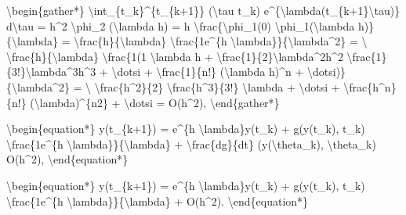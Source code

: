 \documentclass[letterpaper,10pt,english]{jupyterBook}
\begin{document}
\sphinxAtStartPar
\textbackslash{}begin\{gather*\}
\textbackslash{}int\_\{t\_k\}\textasciicircum{}\{t\_\{k+1\}\} (\textbackslash{}tau \sphinxhyphen{} t\_k) e\textasciicircum{}\{\sphinxhyphen{}\textbackslash{}lambda(t\_\{k+1\}\sphinxhyphen{}\textbackslash{}tau)\} d\textbackslash{}tau =
h\textasciicircum{}2 \textbackslash{}phi\_2 (\sphinxhyphen{}\textbackslash{}lambda h) =
h \textbackslash{}frac\{\textbackslash{}phi\_1(0) \sphinxhyphen{} \textbackslash{}phi\_1(\sphinxhyphen{}\textbackslash{}lambda h)\}\{\textbackslash{}lambda\} =
\textbackslash{}frac\{h\}\{\textbackslash{}lambda\} \sphinxhyphen{} \textbackslash{}frac\{1\sphinxhyphen{}e\textasciicircum{}\{\sphinxhyphen{}h \textbackslash{}lambda\}\}\{\textbackslash{}lambda\textasciicircum{}2\} = \textbackslash{}
\textbackslash{}frac\{h\}\{\textbackslash{}lambda\} \sphinxhyphen{} \textbackslash{}frac\{1\sphinxhyphen{}(1 \sphinxhyphen{} \textbackslash{}lambda h + \textbackslash{}frac\{1\}\{2\}\textbackslash{}lambda\textasciicircum{}2h\textasciicircum{}2 \sphinxhyphen{} \textbackslash{}frac\{1\}\{3!\}\textbackslash{}lambda\textasciicircum{}3h\textasciicircum{}3 + \textbackslash{}dotsi + \textbackslash{}frac\{1\}\{n!\} (\sphinxhyphen{}\textbackslash{}lambda h)\textasciicircum{}n + \textbackslash{}dotsi)\}\{\textbackslash{}lambda\textasciicircum{}2\} = \textbackslash{}
\textbackslash{}frac\{h\textasciicircum{}2\}\{2\} \sphinxhyphen{} \textbackslash{}frac\{h\textasciicircum{}3\}\{3!\} \textbackslash{}lambda + \textbackslash{}dotsi + \textbackslash{}frac\{h\textasciicircum{}n\}\{n!\} (\sphinxhyphen{}\textbackslash{}lambda)\textasciicircum{}\{n\sphinxhyphen{}2\} + \textbackslash{}dotsi  =  O(h\textasciicircum{}2),
\textbackslash{}end\{gather*\}

\sphinxAtStartPar
\textbackslash{}begin\{equation*\}
y(t\_\{k+1\}) = e\textasciicircum{}\{\sphinxhyphen{}h \textbackslash{}lambda\}y(t\_k) + g(y(t\_k), t\_k) \textbackslash{}frac\{1\sphinxhyphen{}e\textasciicircum{}\{\sphinxhyphen{}h \textbackslash{}lambda\}\}\{\textbackslash{}lambda\} + \textbackslash{}frac\{dg\}\{dt\} (y(\textbackslash{}theta\_k), \textbackslash{}theta\_k) O(h\textasciicircum{}2),
\textbackslash{}end\{equation*\}

\sphinxAtStartPar
\textbackslash{}begin\{equation*\}
y(t\_\{k+1\}) = e\textasciicircum{}\{\sphinxhyphen{}h \textbackslash{}lambda\}y(t\_k) + g(y(t\_k), t\_k) \textbackslash{}frac\{1\sphinxhyphen{}e\textasciicircum{}\{\sphinxhyphen{}h \textbackslash{}lambda\}\}\{\textbackslash{}lambda\} + O(h\textasciicircum{}2).
\textbackslash{}end\{equation*\}
\end{document}

